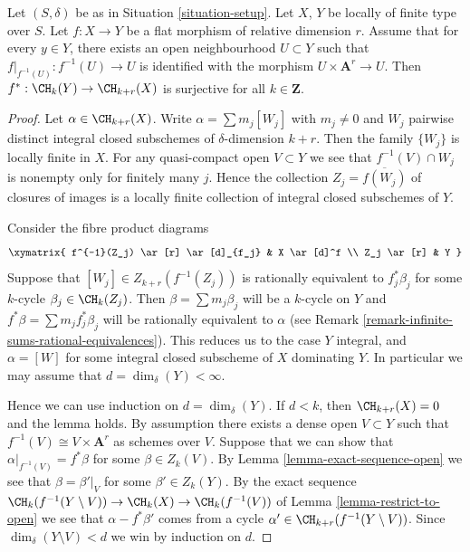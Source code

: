 \begin{lemma}
\label{lemma-pullback-affine-fibres-surjective}
Let $(S, \delta)$ be as in Situation \ref{situation-setup}.
Let $X$, $Y$ be locally of finite type over $S$.
Let $f : X \to Y$ be a flat morphism of relative dimension $r$.
Assume that for every $y \in Y$, there exists an open neighbourhood
$U \subset Y$ such that $f|_{f^{-1}(U)} : f^{-1}(U) \to U$
is identified with the morphism $U \times \mathbf{A}^r \to U$.
Then $f^* : \CH_k(Y) \to \CH_{k + r}(X)$ is surjective for all
$k \in \mathbf{Z}$.
\end{lemma}

\begin{proof}
Let $\alpha \in \CH_{k + r}(X)$.
Write $\alpha = \sum m_j[W_j]$ with $m_j \not = 0$ and
$W_j$ pairwise distinct integral closed subschemes of
$\delta$-dimension $k + r$. Then the family $\{W_j\}$
is locally finite in $X$. For any quasi-compact open
$V \subset Y$ we see that $f^{-1}(V) \cap W_j$
is nonempty only for finitely many $j$. Hence the
collection $Z_j = \overline{f(W_j)}$ of closures
of images is a locally finite collection of integral
closed subschemes of $Y$.

\medskip\noindent
Consider the fibre product diagrams
$$
\xymatrix{
f^{-1}(Z_j) \ar[r] \ar[d]_{f_j} & X \ar[d]^f \\
Z_j \ar[r] & Y
}
$$
Suppose that $[W_j] \in Z_{k + r}(f^{-1}(Z_j))$
is rationally equivalent to $f_j^*\beta_j$ for some
$k$-cycle $\beta_j \in \CH_k(Z_j)$. Then
$\beta = \sum m_j \beta_j$ will be a $k$-cycle on $Y$
and $f^*\beta = \sum m_j f_j^*\beta_j$ will be rationally
equivalent to $\alpha$ (see
Remark \ref{remark-infinite-sums-rational-equivalences}).
This reduces us to the case $Y$ integral, and
$\alpha = [W]$ for some integral closed subscheme
of $X$ dominating $Y$. In particular we may
assume that $d = \dim_\delta(Y) < \infty$.

\medskip\noindent
Hence we can use induction on $d = \dim_\delta(Y)$.
If $d < k$, then $\CH_{k + r}(X) = 0$ and the lemma holds.
By assumption there exists a dense open $V \subset Y$ such
that $f^{-1}(V) \cong V \times \mathbf{A}^r$ as schemes over $V$.
Suppose that we can show that $\alpha|_{f^{-1}(V)} = f^*\beta$
for some $\beta \in Z_k(V)$. By Lemma \ref{lemma-exact-sequence-open}
we see that
$\beta = \beta'|_V$ for some $\beta' \in Z_k(Y)$.
By the exact sequence
$\CH_k(f^{-1}(Y \setminus V)) \to \CH_k(X) \to \CH_k(f^{-1}(V))$
of Lemma \ref{lemma-restrict-to-open}
we see that $\alpha - f^*\beta'$ comes from
a cycle $\alpha' \in \CH_{k + r}(f^{-1}(Y \setminus V))$.
Since $\dim_\delta(Y \setminus V) < d$ we win by
induction on $d$.


\end{proof}

